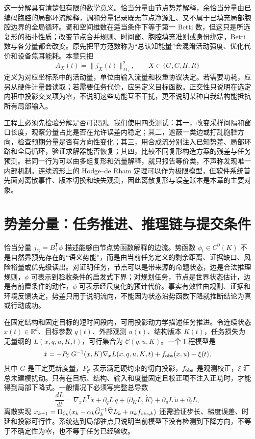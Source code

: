 这一分解具有清楚但有限的数学意义。恰当分量由节点势差解释，余恰当分量由已编码胞腔的局部环流解释，调和分量记录既无节点净源汇、又不属于已填充局部胞腔边界的全局循环。调和空间维数在适当条件下等于第一 Betti 数，但这只是所选复形的拓扑性质；改变节点合并规则、时间窗、胞腔填充准则或身份绑定，Betti 数与各分量都会改变。原先把平方范数称为“总认知能量”会混淆活动强度、优化代价和设备焦耳能耗。本章只把
\[
  A_X(t)=\|j_X(t)\|_{M_1}^{2},\qquad X\in\{G,C,H,R\}
\]
定义为对应坐标系中的活动量，单位由输入流量和权重协议决定。若需要功耗，应另从硬件计量器读取；若需要任务代价，应另定义目标函数。正交性只说明在选定内积中投影交叉项为零，不说明这些功能互不干扰，更不说明某种自我结构能抵抗所有局部输入。

工程上必须先检验分解是否可识别。我们使用四类测试：其一，改变采样间隔和窗口长度，观察分量占比是否在允许误差内稳定；其二，遮蔽一类边或打乱胞腔方向，检查预期分量是否有方向性变化；其三，用合成流分别注入已知势差、局部环路和全局循环，验证求解器能否恢复；其四，比较不同复形构造方案的残差与任务预测。若同一行为可以由多组复形和流量解释，就只报告等价类，不声称发现唯一内部机制。连续流形上的 Hodge--de Rham 定理可以作为极限模型，但软件系统首先面对离散事件、版本切换和缺失观测，因此离散复形与误差账本是本章的主要对象。

\section{势差分量：任务推进、推理链与提交条件}
\label{sec:section_2958}

恰当分量 $j_G=B_1^{\mathsf T}\phi$ 描述能够由节点势函数解释的边流。势函数 $\phi_t\in C^0(K)$ 不是自然界预先存在的“语义势能”，而是由当前任务定义的剩余距离、证据缺口、风险裕量或优先级读出。对证明任务，节点可以是带来源的命题状态，边是合法推理规则，$\phi$ 可表示到验收条件的启发式下界；对规划任务，节点是世界状态估计，边是有前置条件的动作，$\phi$ 可表示经尺度化的预计代价。事实有效性由规则、证据和环境反馈决定，势差只用于说明流向，不能因为状态沿势函数下降就推断结论为真或行动成功。

在固定结构和固定目标的短时间段内，可用投影动力学描述任务推进。令连续状态 $x(t)\in\mathbb{R}^{d}$、目标参数 $q(t)$、外部观测 $u(t)$、结构版本 $K(t)$，任务损失为无量纲的 $L(x,q,u,K,t)$，可行集合为 $\mathcal{C}(q,u,K)$。一个工程模型是
\begin{equation}
  \dot{x}=-P_{\mathcal{C}}\,G^{-1}(x,K)\nabla_xL(x,q,u,K,t)+f_{\rm obs}(x,u)+\xi(t),
  \label{eq:rheology_goal_flow}
\end{equation}
其中 $G$ 是正定更新度量，$P_{\mathcal{C}}$ 表示满足硬约束的切向投影，$f_{\rm obs}$ 是观测校正，$\xi$ 汇总未建模扰动。只有在目标、结构、输入和度量固定且校正项不注入正功时，才能得到局部下降式。一般情况下必须写完整总导数
\[
 \frac{dL}{dt}=\nabla_xL^{\mathsf T}\dot{x}+\partial_qL\,\dot q
 +\langle\partial_KL,\dot K\rangle+\partial_uL\,\dot u+\partial_tL,
\]
离散实现 $x_{k+1}=\Pi_{\mathcal C_k}(x_k-\alpha_k\widehat G_k^{-1}\widehat\nabla L_k+\alpha_k f_{{\rm obs},k})$ 还需验证步长、梯度误差、时延和投影可行性。系统达到局部驻点只说明当前模型下没有检测到下降方向，不等于不确定性为零，也不等于任务已经验收。

